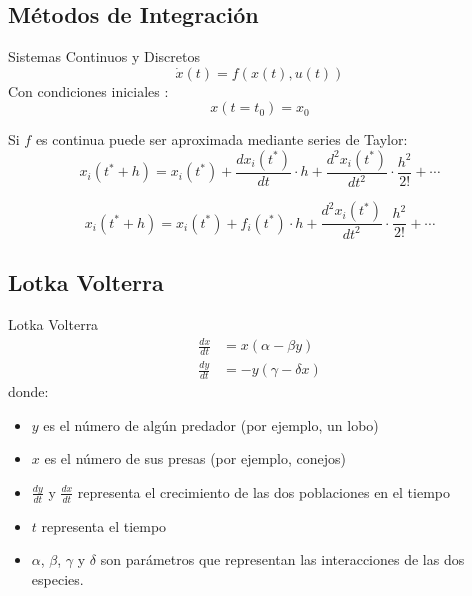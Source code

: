 \documentclass{beamer}
\begin{document}
\subsection{Métodos de Integración}
\begin{frame}{Sistemas Continuos y Discretos}
	\begin{equation*} 
	\dot{x}(t) = f (x(t), u(t))
	\end{equation*}
	Con condiciones iniciales :
	\begin{equation*}
	x(t = t_0 ) = x_0
	\end{equation*}

	Si $f$ es continua puede ser aproximada mediante series de Taylor:
	\begin{equation*}
		x_i(t^* + h) = x_i(t^*) + \frac{dx_i (t^*)}{dt} \cdot h + \frac{d^{2}x_i (t^*)}{dt^2} \cdot \frac{h^2}{2!} + \cdots
	\end{equation*}

	\begin{equation*}
		x_i(t^* + h) = x_i(t^*) + f_i(t^*) \cdot h + \frac{d^{2}x_i (t^*)}{dt^2} \cdot \frac{h^2}{2!} + \cdots
	\end{equation*}

\end{frame}

\subsection{Lotka Volterra}
\begin{frame}{Lotka Volterra}
	\begin{align*}
		\frac{dx}{dt} &= x(\alpha - \beta y) \\
		\frac{dy}{dt} &= - y(\gamma - \delta  x)
	\end{align*}
	donde:
	\begin{itemize}
		\item $y$ es el número de algún predador (por ejemplo, un lobo)
		\item $x$ es el número de sus presas (por ejemplo, conejos)
		\item $\frac{dy}{dt}$ y $\frac{dx}{dt}$ representa el crecimiento de las dos poblaciones en el tiempo
		\item $t$ representa el tiempo 
		\item $\alpha$, $\beta$, $\gamma$ y $\delta$ son parámetros que representan las interacciones de las dos especies.
	\end{itemize}
\end{frame}
\end{document}
